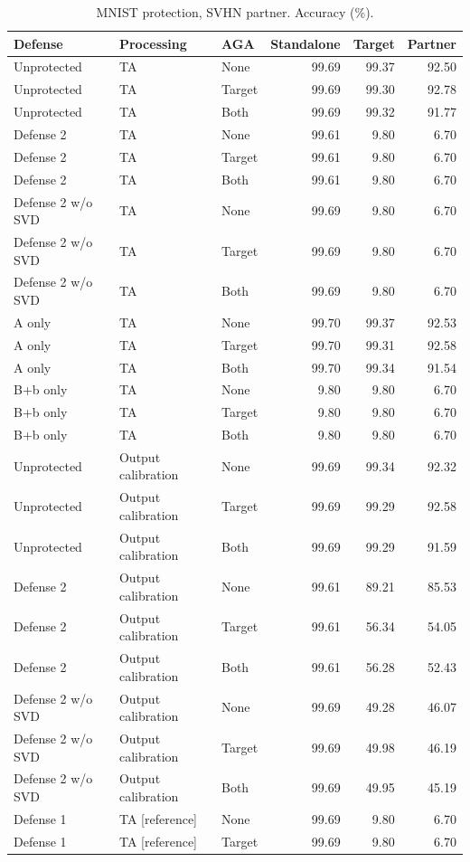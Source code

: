 \begin{table}[t]
\centering\small
\caption{MNIST protection, SVHN partner. Accuracy (\%).}
\begin{tabular}{lllrrr}
\toprule
Defense & Processing & AGA & Standalone & Target & Partner \\
\midrule
Unprotected & TA & None & 99.69 & 99.37 & 92.50 \\
Unprotected & TA & Target & 99.69 & 99.30 & 92.78 \\
Unprotected & TA & Both & 99.69 & 99.32 & 91.77 \\
Defense 2 & TA & None & 99.61 & 9.80 & 6.70 \\
Defense 2 & TA & Target & 99.61 & 9.80 & 6.70 \\
Defense 2 & TA & Both & 99.61 & 9.80 & 6.70 \\
Defense 2 w/o SVD & TA & None & 99.69 & 9.80 & 6.70 \\
Defense 2 w/o SVD & TA & Target & 99.69 & 9.80 & 6.70 \\
Defense 2 w/o SVD & TA & Both & 99.69 & 9.80 & 6.70 \\
A only & TA & None & 99.70 & 99.37 & 92.53 \\
A only & TA & Target & 99.70 & 99.31 & 92.58 \\
A only & TA & Both & 99.70 & 99.34 & 91.54 \\
B+b only & TA & None & 9.80 & 9.80 & 6.70 \\
B+b only & TA & Target & 9.80 & 9.80 & 6.70 \\
B+b only & TA & Both & 9.80 & 9.80 & 6.70 \\
Unprotected & Output calibration & None & 99.69 & 99.34 & 92.32 \\
Unprotected & Output calibration & Target & 99.69 & 99.29 & 92.58 \\
Unprotected & Output calibration & Both & 99.69 & 99.29 & 91.59 \\
Defense 2 & Output calibration & None & 99.61 & 89.21 & 85.53 \\
Defense 2 & Output calibration & Target & 99.61 & 56.34 & 54.05 \\
Defense 2 & Output calibration & Both & 99.61 & 56.28 & 52.43 \\
Defense 2 w/o SVD & Output calibration & None & 99.69 & 49.28 & 46.07 \\
Defense 2 w/o SVD & Output calibration & Target & 99.69 & 49.98 & 46.19 \\
Defense 2 w/o SVD & Output calibration & Both & 99.69 & 49.95 & 45.19 \\
Defense 1 & TA [reference] & None & 99.69 & 9.80 & 6.70 \\
Defense 1 & TA [reference] & Target & 99.69 & 9.80 & 6.70 \\
\bottomrule
\end{tabular}
\end{table}

